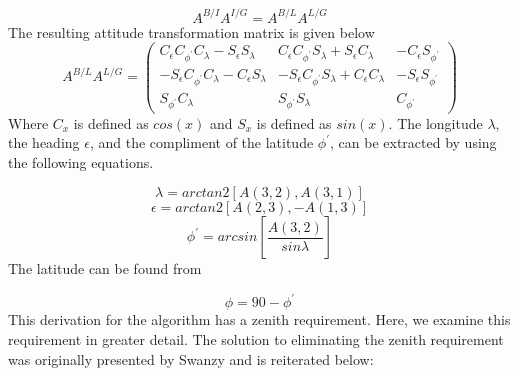\documentclass[]{aiaa-tc}%
\begin{document}
\begin{equation}
 \label{fuck}
 A^{B/I}A^{I/G} = A^{B/L}A^{L/G}
\end{equation}
The resulting attitude transformation matrix is given below
\begin{equation}
 \label{fuck}
A^{B/L}A^{L/G} =
    \begin{pmatrix}
    C_{\epsilon}C_{\phi^{'}}C_{\lambda} - S_{\epsilon}S_{\lambda} &
    C_{\epsilon}C_{\phi^{'}}S_{\lambda} + S_{\epsilon}C_{\lambda} &
    -C_{\epsilon}S_{\phi^{'}}\\
    -S_{\epsilon}C_{\phi^{'}}C_{\lambda} - C_{\epsilon}S_{\lambda}&
    -S_{\epsilon}C_{\phi^{'}}S_{\lambda} + C_{\epsilon}C_{\lambda}&
    -S_{\epsilon}S_{\phi^{'}} \\
    S_{\phi^{'}}C_{\lambda} & S_{\phi^{'}}S_{\lambda} & C_{\phi^{'}}
    \end{pmatrix}
\end{equation}
Where $C_{x}$ is defined as $cos(x)$ and $S_{x}$ is defined as $sin(x)$.  The longitude $\lambda$, the heading $\epsilon$, and the compliment of the latitude $\phi^{'}$, can be extracted by using the following equations.  

\begin{equation}
 \label{e:lambdaa}
    \lambda = arctan2[A(3,2), A(3,1)]
\end{equation}
\begin{equation}
 \label{e:epsilonn}
    \epsilon = arctan2[A(2,3), -A(1,3)]
\end{equation}
\begin{equation}
 \label{e:phii}
    \phi^{'} = arcsin[\frac{A(3,2)}{sin\lambda}]
\end{equation}
The latitude can be found from

\begin{equation}
 \label{e:phi}
    \phi = 90 - \phi^{'}
\end{equation}
This derivation for the algorithm has a zenith requirement\cite{b:gpsapps}. Here, we examine this requirement in greater detail. The solution to eliminating the zenith requirement was originally presented by Swanzy and is reiterated below:
\end{document}

